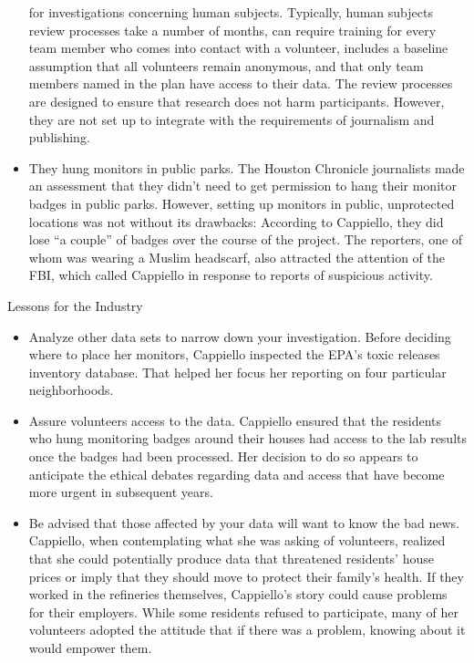 \begin{itemize}
for investigations concerning human subjects. Typically, human
subjects review processes take a number of months, can require training
for every team member who comes into contact with a volunteer,
includes a baseline assumption that all volunteers remain anonymous,
and that only team members named in the plan have access to their
data. The review processes are designed to ensure that research does
not harm participants. However, they are not set up to integrate with
the requirements of journalism and publishing.
\item They hung monitors in public parks.
The Houston Chronicle journalists made an assessment that they
didn't need to get permission to hang their monitor badges in public
parks. However, setting up monitors in public, unprotected locations
was not without its drawbacks: According to Cappiello, they did lose
``a couple'' of badges over the course of the project. The reporters,
one of whom was wearing a Muslim headscarf, also attracted the
attention of the FBI, which called Cappiello in response to reports of
suspicious activity.
\end{itemize}

Lessons for the Industry
\begin{itemize}
\item Analyze other data sets to narrow down your investigation.
Before deciding where to place her monitors, Cappiello inspected the
EPA's toxic releases inventory database. That helped her focus her
reporting on four particular neighborhoods.
\item Assure volunteers access to the data.
Cappiello ensured that the residents who hung monitoring badges
around their houses had access to the lab results once the badges had
been processed. Her decision to do so appears to anticipate the ethical
debates regarding data and access that have become more urgent
in subsequent years.
\item Be advised that those affected by your data will want to know
the bad news.
Cappiello, when contemplating what she was asking of volunteers,
realized that she could potentially produce data that threatened residents'
house prices or imply that they should move to protect their
family's health. If they worked in the refineries themselves, Cappiello's
story could cause problems for their employers. While some residents
refused to participate, many of her volunteers adopted the attitude
that if there was a problem, knowing about it would empower them.
\end{itemize}

